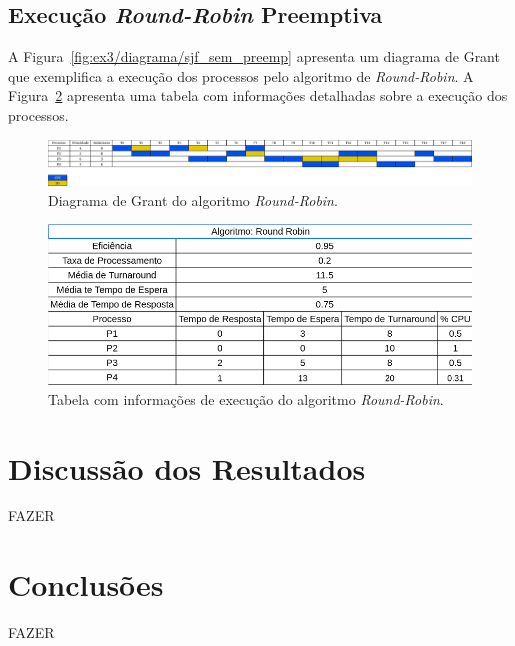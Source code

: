 \documentclass[
	12pt,				%
	oneside,   	        %
	a4paper,			%
	english,			%
	french,				%
	spanish,			%
	brazil,				%
	]{pacotes/abntex2}
\begin{document}
\subsection{Execução \textit{Round-Robin} Preemptiva}
\label{subsubsec:rr}

A Figura~\ref{fig:ex3/diagrama/sjf_sem_preemp} apresenta um diagrama de Grant que exemplifica a execução dos processos pelo algoritmo de \textit{Round-Robin}. A Figura~\ref{fig:ex3/tabela/rr} apresenta uma tabela com informações detalhadas sobre a execução dos processos.

\begin{figure}[H]
  \centering
  \includegraphics[scale=0.20]{figuras/ex3/diagrama/rr.png}
  \caption{Diagrama de Grant do algoritmo \textit{Round-Robin}.}
  \label{fig:ex3/diagrama/rr}
\end{figure}

\begin{figure}[H]
  \centering
  \includegraphics[scale=0.5]{figuras/ex3/tabela/round_robin.png}
  \caption{Tabela com informações de execução do algoritmo \textit{Round-Robin}.}
  \label{fig:ex3/tabela/rr}
\end{figure}

\section{Discussão dos Resultados}
\label{sec:discussao}

FAZER

\section{Conclusões}
\label{sec:conclusoes}

FAZER

\postextual
\renewcommand{\bibsection}{%
\section{\bibname}
\bibmark
\prebibhook}


\end{document}
